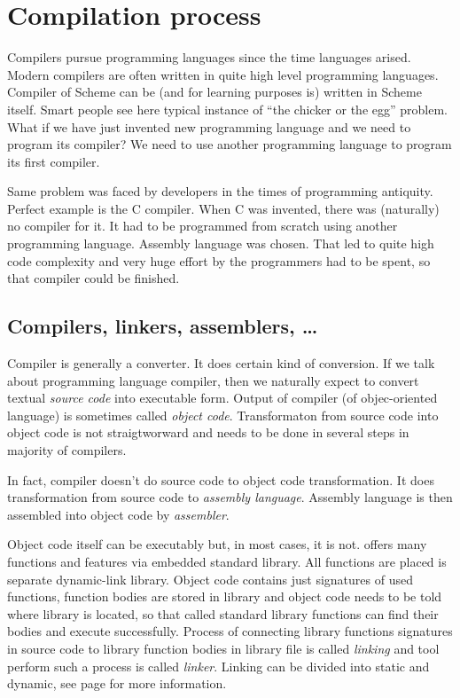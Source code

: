 \section{Compilation process}\label{section:compilation}
Compilers pursue programming languages since the time languages arised. Modern compilers are often written in quite high level programming languages. Compiler of Scheme can be (and for learning purposes is) written in Scheme itself. Smart people see here typical instance of \enquote{the chicker or the egg} problem. What if we have just invented new programming language and we need to program its compiler? We need to use another programming language to program its first compiler.

Same problem was faced by developers in the times of programming antiquity. Perfect example is the C compiler. When C was invented, there was (naturally) no compiler for it. It had to be programmed from scratch using another programming language. Assembly language was chosen. That led to quite high code complexity and very huge effort by the programmers had to be spent, so that compiler could be finished.


\subsection{Compilers, linkers, assemblers, \ldots}
Compiler is generally a converter. It does certain kind of conversion. If we talk about programming language compiler, then we naturally expect to convert textual \textit{source code} into executable form. Output of compiler (of objec-oriented language) is sometimes called \textit{object code}. Transformaton from source code into object code is not straigtworward and needs to be done in several steps in majority of \cpp compilers.

In fact, compiler doesn't do source code to object code transformation. It does transformation from source code to \textit{assembly language}. Assembly language is then assembled into object code by \textit{assembler}.

Object code itself can be executably but, in most cases, it is not. \cpp offers many functions and features via embedded standard library. All functions are placed is separate dynamic-link library. Object code contains just signatures of used functions, function bodies are stored in library and object code needs to be told where library is located, so that called standard library functions can find their bodies and execute successfully. Process of connecting library functions signatures in source code to library function bodies in library file is called \textit{linking} and tool perform such a process is called \textit{linker}. Linking can be divided into static and dynamic, see page \pageref{listing:linking} for more information.

